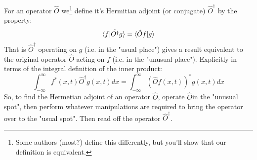 \documentclass[12pt]{book}
\begin{document}
For an operator $\hat{O}$ we\footnote{Some authors (most?) define this differently, but you'll show that our definition is equivalent.} define it's Hermitian adjoint (or conjugate) $\hat{O}^\dagger$ by the property:
\begin{equation}
\braket{f|\hat{O^\dagger}g} = \braket{\hat{O} f| g}
\end{equation}
That is $\hat{O}^\dagger$ operating on $g$ (i.e. in the "usual place") gives a result equivalent to the original operator $\hat{O}$ acting on $f$ (i.e. in the "unusual place").  Explicitly in terms of the integral definition of the inner product:
\begin{equation}
\int_{-\infty}^{\infty} f^*(x,t)\hat{O}^\dagger g(x,t) dx = 
\int_{-\infty}^{\infty} \left( \hat{O} f(x,t)\right)^* g(x,t) dx
\end{equation}
So, to find the Hermetian adjoint of an operator $\hat{O}$, operate $\hat{O}$in the "unusual spot", then perform whatever manipulations are required to bring the operator over to the "usual spot".  Then read off the operator $\hat{O}^\dagger$.
\end{document}
